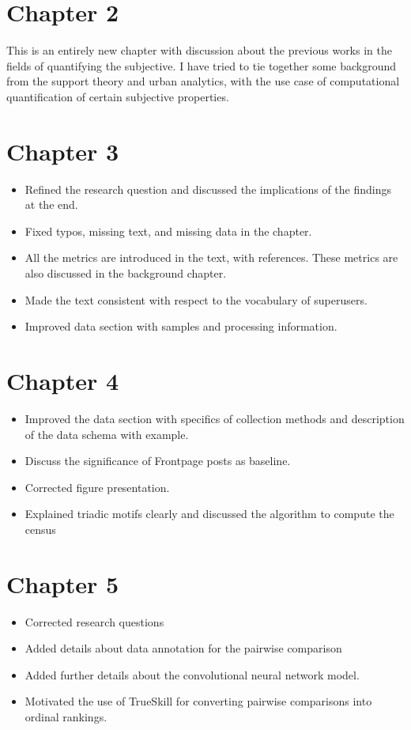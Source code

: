 \documentclass[11pt,a4paper,roman]{moderncv}
\begin{document}
\section{Chapter 2}
This is an entirely new chapter with discussion about the previous works in the fields of quantifying the subjective. I have tried to tie together some background from the support theory and urban analytics, with the use case of computational quantification of certain subjective properties. 

\section{Chapter 3}
\begin{itemize}
    \item Refined the research question and discussed the implications of the findings at the end. 
    \item Fixed typos, missing text, and missing data in the chapter.
    \item All the metrics are introduced in the text, with references. These metrics are also discussed in the background chapter. 
    \item Made the text consistent with respect to the vocabulary of superusers.
    \item Improved data section with samples and processing information. 
\end{itemize}


\section{Chapter 4}

\begin{itemize}
    \item Improved the data section with specifics of collection methods and description of the data schema with example. 
    \item Discuss the significance of Frontpage posts as baseline.
    \item Corrected figure presentation. 
    \item Explained triadic motifs clearly and discussed the algorithm to compute the census
\end{itemize}

\section{Chapter 5}

\begin{itemize}
    \item Corrected research questions 
    \item Added details about data annotation for the pairwise comparison
    \item Added further details about the convolutional neural network model.
    \item Motivated the use of TrueSkill for converting pairwise comparisons into ordinal rankings.
\end{itemize}
\end{document}
